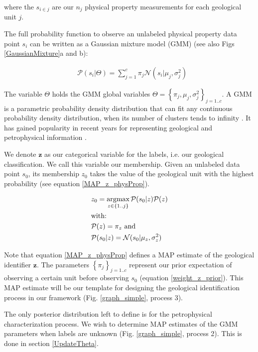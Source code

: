 \documentclass[extra]{gji} %
\begin{document}
where the ${s}_{i \in j}$ are our $n_j$ physical property measurements for each geological unit $j$.

The full probability function to observe an unlabeled physical property data point ${s}_i$ can be written as a Gaussian mixture model (GMM) (see also Figs \ref{GaussianMixture}a and b):

\begin{align}
&\mathcal{P}({s}_i|\Theta) = \sum_{j=1}^c \pi_j \mathcal{N}({s}_i|{\mu}_j,\sigma_j^2) \label{GMM}
\end{align}

The variable $\Theta$ holds the GMM global variables $\Theta= \left\{\pi_j, {\mu}_j, \sigma_j^2\right\}_{j=1..c}$. A GMM is a parametric probability density distribution that can fit any continuous probability density distribution, when its number of clusters tends to infinity \citep{Murphy:2012:MLP:2380985}. It has gained popularity in recent years for representing geological and petrophysical information \citep{Giraud2017, Grana2010, Grana2017,Granek_2011}.

We denote $\mathbf{z}$ as our categorical variable for the labels, i.e. our geological classification. We call this variable our membership. Given an unlabeled data point ${s}_0$, its membership $z_0$ takes the value of the geological unit with the highest probability (see equation \ref{MAP_z_physProp}).

\begin{align}
&z_0 = \mathop{\hbox{argmax}}\limits_{z \in \left\{1..j\right\}}\mathcal{P}(s_0|z)\mathcal{P}(z) \label{MAP_z_physProp}\\
&\text{with:} \nonumber \\
&\mathcal{P}(z) = \pi_z \text{ and}\label{weight_z_prior} \\
&\mathcal{P}(s_0|z)=\mathcal{N}({s}_0| {\mu}_{z},\sigma_{z}^2)
\end{align}

Note that equation \ref{MAP_z_physProp} defines a MAP estimate of the geological identifier $\mathbf{z}$. The parameters $\left\{\pi_j\right\}_{j=1..c}$ represent our prior expectation of observing a certain unit before observing ${s}_0$ (equation \ref{weight_z_prior}). This MAP estimate will be our template for designing the geological identification process in our framework (Fig. \ref{graph_simple}, process 3).

The only posterior distribution left to define is for the petrophysical characterization process. We wish to determine MAP estimates of the GMM parameters when labels are unknown (Fig. \ref{graph_simple}, process 2). This is done in section \ref{UpdateTheta}.
\end{document}
